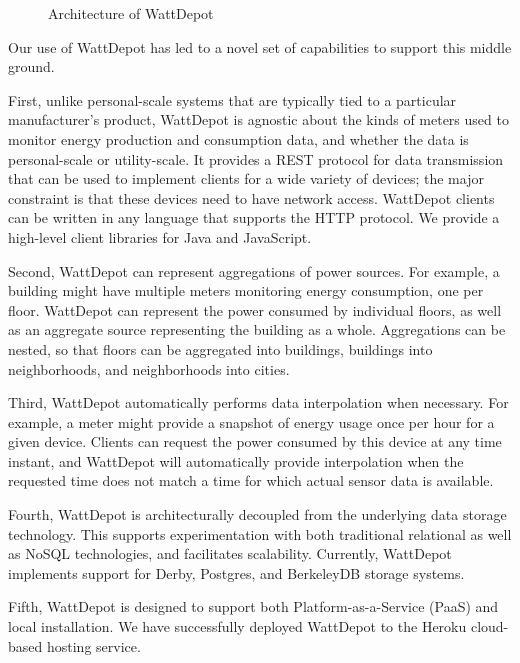 \documentclass{acm_proc_article-sp}
\begin{document}
\begin{figure}
\begin{center}
\end{center}
\caption{Architecture of WattDepot}
\label{fig:wattdepot}
\end{figure}

Our use of WattDepot has led to a novel set of capabilities to support
this middle ground.

First, unlike personal-scale systems that are typically tied to a particular
manufacturer's product, WattDepot is agnostic about the kinds of meters used to monitor
energy production and consumption data, and whether the data is personal-scale or
utility-scale. It provides a REST protocol for data transmission that can be used to
implement clients for a wide variety of devices; the major constraint is that these
devices need to have network access. WattDepot clients can be written in any language
that supports the HTTP protocol. We provide a high-level client libraries for Java and JavaScript.

Second, WattDepot can represent aggregations of power sou\-rces. For example, a building
might have multiple meters monitoring energy consumption, one per floor. WattDepot can
represent the power consumed by individual floors, as well as an aggregate source
representing the building as a whole. Aggregations can be nested, so that floors can be
aggregated into buildings, buildings into neighborhoods, and neighborhoods into cities.

Third, WattDepot automatically performs data interpolation when necessary. For example, a
meter might provide a snapshot of energy usage once per hour for a given device. Clients
can request the power consumed by this device at any time instant, and WattDepot will
automatically provide interpolation when the requested time does not match a time for
which actual sensor data is available.

Fourth, WattDepot is architecturally decoupled from the underlying data storage
technology. This supports experimentation with both traditional relational as well as
NoSQL technologies, and facilitates scalability. Currently, WattDepot implements support
for Derby, Postgres, and BerkeleyDB storage systems.

Fifth, WattDepot is designed to support both Platform-as-a-Service (PaaS) and local
installation. We have successfully deployed WattDepot to the Heroku cloud-based hosting service.
\end{document}
